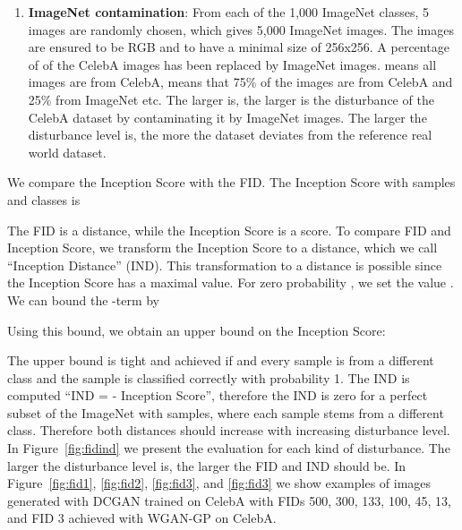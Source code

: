 \documentclass{article}
\begin{document}
\begin{enumerate}
\item {\bf ImageNet contamination}: From each of the 1,000 ImageNet classes,
5 images are randomly chosen, which gives 5,000 ImageNet images.
The images are ensured to be RGB and to have a minimal size of 256x256.
A percentage of  of the
CelebA images has been replaced by ImageNet images.
 means all images are from CelebA,  means that
75\% of the images are from CelebA and 25\% from ImageNet etc.
The larger  is, the larger is the disturbance of the CelebA dataset
by contaminating it by ImageNet images.
The larger the disturbance level is, the more the dataset
deviates from the reference real world dataset.
\end{enumerate}


We compare the Inception Score \cite{Salimans:16} with the FID.
The Inception Score with  samples and  classes is

The FID is a distance, while the Inception Score is a score.
To compare FID and Inception Score,
we transform the Inception Score to a distance,
which we call ``Inception Distance'' (IND).
This transformation to a distance
is possible since the Inception Score has a
maximal value.
For zero probability ,
we set the value .
We can bound the -term by

Using this bound, we obtain an upper bound on the Inception Score:

The upper bound is tight and achieved if  and every sample is from a
different class and the sample is classified correctly with
probability 1.
The IND is computed ``IND =  - Inception Score'', therefore the IND is
zero for a perfect subset of the ImageNet with  samples,
where each sample stems from a different class.
Therefore both distances should increase with increasing disturbance level.
In Figure~\ref{fig:fidind} we present the evaluation
for each kind of disturbance. The larger the disturbance level is, the larger
the FID and IND  should be. In Figure~\ref{fig:fid1},
\ref{fig:fid2}, \ref{fig:fid3}, and \ref{fig:fid3} we show examples of images
generated with DCGAN trained on CelebA with FIDs 500, 300, 133, 100, 45, 13, and FID 3 achieved with
WGAN-GP on CelebA.
\end{document}
